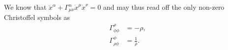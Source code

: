 \documentclass[english, parskip=full]{scrartcl}
\begin{document}
We know that $\ddot{x}^\alpha + \Gamma^\alpha_{\mu\nu} \dot{x}^\mu \dot{x}^\nu = 0$ and may thus read off the only non-zero Christoffel symbols as
\begin{align}
\Gamma^\rho_{\phi\phi} &= -\rho,\\
\Gamma^\phi_{\rho\phi} &= \frac{1}{\rho}.
\end{align}


\end{document}
